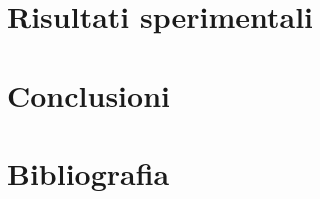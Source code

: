 \documentclass[a4paper,12pt]{book}
\begin{document}
\chapter{Risultati sperimentali} %
\label{chapter:terzo} %

\clearpage{\pagestyle{plain}\cleardoublepage} %
\chapter{Conclusioni} %
\label{chapter:quarto} %

\pagestyle{plain}
\cleardoublepage
\chapter*{Bibliografia} %
\printbibliography[heading=none]
\end{document}
